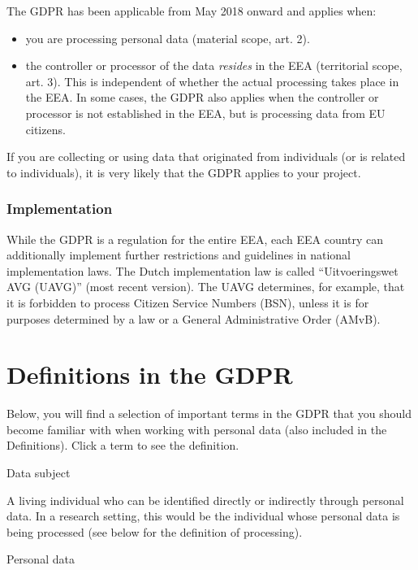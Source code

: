 \documentclass[
]{book}
\providecommand{\tightlist}{%
  \setlength{\itemsep}{0pt}\setlength{\parskip}{0pt}}
\begin{document}
The GDPR has been applicable from May 2018 onward and applies when:

\begin{itemize}
\tightlist
\item
  you are processing personal data
  (material scope, art. 2).
\item
  the controller or processor of the data \emph{resides} in the EEA (territorial
  scope, art. 3).
  This is independent of whether the actual processing takes place in the EEA.
  In some cases, the GDPR also applies when the controller or processor is not
  established in the EEA, but is processing data from EU citizens.
\end{itemize}

If you are collecting or using data that originated from individuals (or is
related to individuals), it is very likely that the GDPR applies to your project.

\hypertarget{implementation}{%
\subsubsection{Implementation}\label{implementation}}

While the GDPR is a regulation for the entire EEA, each EEA country can additionally
implement further restrictions and guidelines in national implementation laws. The
Dutch implementation law is called ``Uitvoeringswet AVG (UAVG)''
(most recent version).
The UAVG determines, for example, that it is forbidden to process Citizen
Service Numbers (BSN), unless it is for purposes determined by a law or a
General Administrative Order (AMvB).

\hypertarget{definitions}{%
\section{Definitions in the GDPR}\label{definitions}}

Below, you will find a selection of important terms in the GDPR that you should
become familiar with when working with personal data (also included in the
Definitions). Click a term to see the definition.

Data subject

A living individual who can be identified directly or indirectly through
personal data. In a research setting, this would be the individual whose
personal data is being processed (see below for the definition of processing).

Personal data
\end{document}
